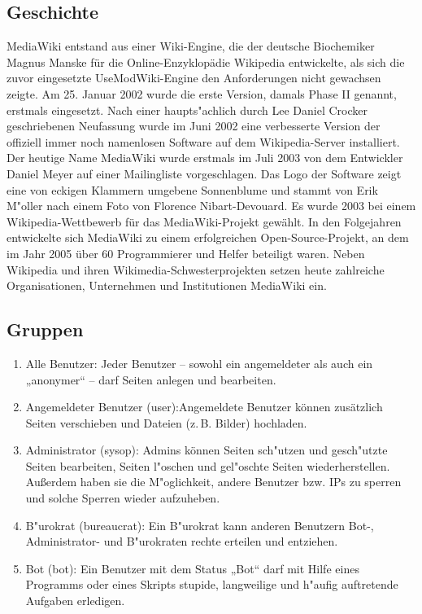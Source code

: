 \subsection{Geschichte}
MediaWiki entstand aus einer Wiki-Engine, die der deutsche Biochemiker Magnus Manske für die Online-Enzyklopädie Wikipedia entwickelte, als sich die zuvor eingesetzte UseModWiki-Engine den Anforderungen nicht gewachsen zeigte. Am 25. Januar 2002 wurde die erste Version, damals Phase II genannt, erstmals eingesetzt. Nach einer haupts"achlich durch Lee Daniel Crocker geschriebenen Neufassung wurde im Juni 2002 eine verbesserte Version der offiziell immer noch namenlosen Software auf dem Wikipedia-Server installiert. Der heutige Name MediaWiki wurde erstmals im Juli 2003 von dem Entwickler Daniel Meyer auf einer Mailingliste vorgeschlagen. Das Logo der Software zeigt eine von eckigen Klammern umgebene Sonnenblume und stammt von Erik M"oller nach einem Foto von Florence Nibart-Devouard. Es wurde 2003 bei einem Wikipedia-Wettbewerb für das MediaWiki-Projekt gewählt. In den Folgejahren entwickelte sich MediaWiki zu einem erfolgreichen Open-Source-Projekt, an dem im Jahr 2005 über 60 Programmierer und Helfer beteiligt waren. Neben Wikipedia und ihren Wikimedia-Schwesterprojekten setzen heute zahlreiche Organisationen, Unternehmen und Institutionen MediaWiki ein.
\subsection{Gruppen}
\begin{enumerate}
	\item Alle Benutzer:
	Jeder Benutzer – sowohl ein angemeldeter als auch ein „anonymer“ – darf Seiten anlegen und bearbeiten.
	\item Angemeldeter Benutzer (user):Angemeldete Benutzer können zusätzlich Seiten verschieben und Dateien (z. B. Bilder) hochladen.
	\item Administrator (sysop): Admins können Seiten sch"utzen und gesch"utzte Seiten bearbeiten, Seiten l"oschen und gel"oschte Seiten wiederherstellen. Außerdem haben sie die M"oglichkeit, andere Benutzer bzw. IPs zu sperren und solche Sperren wieder aufzuheben.
	\item B"urokrat (bureaucrat): Ein B"urokrat kann anderen Benutzern Bot-, Administrator- und B"urokraten rechte erteilen und entziehen.
	\item Bot (bot): Ein Benutzer mit dem Status „Bot“ darf mit Hilfe eines Programms oder eines Skripts stupide, langweilige und h"aufig auftretende Aufgaben erledigen.
\end{enumerate}


